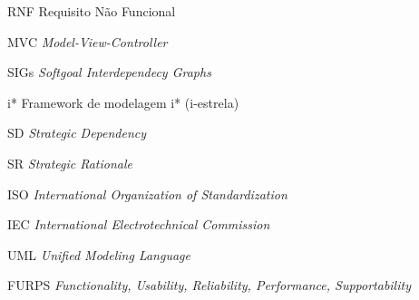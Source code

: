 \begin{siglas}
  \item[RNF] Requisito Não Funcional
  \item[MVC] \textit{Model-View-Controller}
  \item[SIGs] \textit{Softgoal Interdependecy Graphs}
  \item[i*] Framework de modelagem i* (i-estrela)
  \item[SD] \textit{Strategic Dependency}
  \item[SR] \textit{Strategic Rationale}
  \item[ISO] \textit{International Organization of Standardization}
  \item[IEC] \textit{International Electrotechnical Commission}
  \item[UML] \textit{Unified Modeling Language}
  \item[FURPS] \textit{Functionality, Usability, Reliability, Performance, Supportability} 
\end{siglas}
